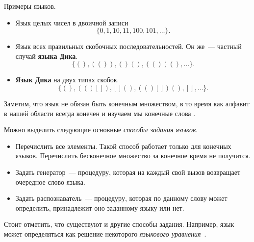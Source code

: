 \begin{example}
    Примеры языков.

    \begin{itemize}
        \item Язык целых чисел в двоичной записи
              \[\{0, 1, 10, 11, 100, 101, \dots\}.\]
        \item Язык всех правильных скобочных последовательностей. Он же~--- частный случай \textbf{языка Дика}.
              \[\{(), (()), ()(), (())(), \dots\}.\]
        \item \textbf{Язык Дика} на двух типах скобок.
              \[\{(), (()[]), [](), (()[])(), [], \dots\}.\]
    \end{itemize}
\end{example}

Заметим, что язык не обязан быть конечным множеством, в то время как алфавит в нашей области всегда конечен%
и изучаем мы конечные слова%
.

Можно выделить следующие основные \emph{способы задания языков}.
\begin{itemize}
    \item Перечислить все элементы.
          Такой способ работает только для конечных языков.
          Перечислить бесконечное множество за конечное время не получится.
    \item Задать генератор~--- процедуру, которая на каждый свой вызов возвращает очередное слово языка.
    \item Задать распознаватель~--- процедуру, которая по данному слову может определить, принадлежит оно заданному языку или нет.
\end{itemize}

Стоит отметить, что существуют и другие способы задания.
Например, язык может определяться как решение некоторого \emph{языкового уравнения}~.
